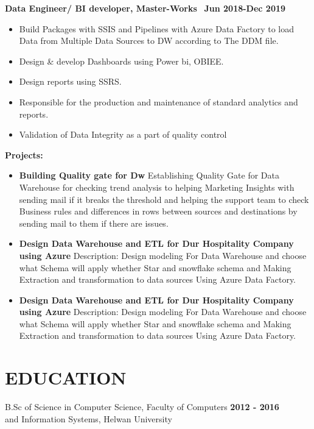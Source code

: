 \documentclass{res}
\begin{document}
\begin{resume}
\vspace{1 mm } 
\textbf{Data Engineer/ BI developer, Master-Works}
\quad \quad  \quad \quad \quad \quad \quad \quad \quad \quad \quad 
\quad \quad \quad\quad \quad \quad \quad \quad \quad\ \quad \textbf{Jun 2018-Dec 2019} 
\vspace{-02 mm}
\begin{itemize}
\item Build Packages with SSIS and Pipelines with Azure Data Factory to load Data from Multiple Data Sources to DW according to The DDM file.
\item Design \& develop Dashboards using Power bi, OBIEE.
\item Design reports using SSRS.
\item Responsible for the production and maintenance of standard analytics and reports.
\item Validation of Data Integrity as a part of quality control
\end{itemize} 
\textbf{Projects:} 
\vspace{2 mm } 
\begin{itemize}
	\item \textbf{Building Quality gate for Dw} Establishing Quality Gate for Data Warehouse for checking trend analysis to helping Marketing
	Insights with sending mail if it breaks the threshold and helping the support team to check Business rules
	and differences in rows between sources and destinations by sending mail to them if there are issues.
	\item \textbf{Design Data Warehouse and ETL for Dur Hospitality Company using Azure}
	Description: Design modeling For Data Warehouse and choose what Schema will apply
	whether Star and snowflake schema and Making Extraction and transformation to data sources
	Using Azure Data Factory.
	\item \textbf{Design Data Warehouse and ETL for Dur Hospitality Company using Azure}
	Description: Design modeling For Data Warehouse and choose what Schema will apply
	whether Star and snowflake schema and Making Extraction and transformation to data sources
	Using Azure Data Factory.
\end{itemize}
\section{EDUCATION}          
    B.Sc of Science in Computer Science, Faculty of Computers \quad \quad
    \quad \quad  
    \quad \quad \quad \quad \quad \quad \quad 
    \quad \quad \quad \quad \quad \quad \quad \quad  \textbf{2012 - 2016} \\
    and Information Systems, Helwan University         


\end{resume}
\end{document}
